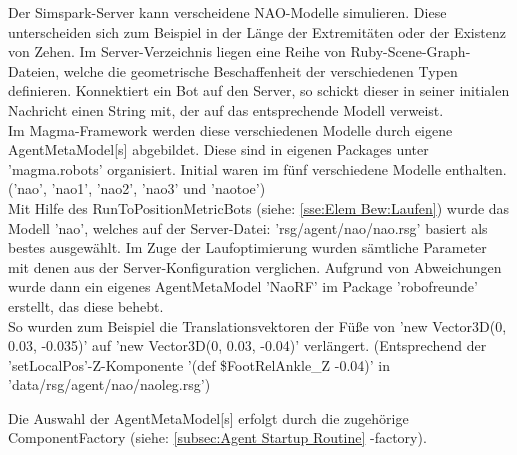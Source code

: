 Der Simspark-Server kann verscheidene NAO-Modelle simulieren. Diese unterscheiden sich zum
Beispiel in der Länge der Extremitäten oder der Existenz von Zehen. Im Server-Verzeichnis
liegen eine Reihe von Ruby-Scene-Graph-Dateien, welche die geometrische Beschaffenheit der
verschiedenen Typen definieren. Konnektiert ein Bot auf den Server, so schickt dieser in seiner initialen Nachricht einen String mit, der auf das entsprechende Modell verweist.\\

Im Magma-Framework werden diese verschiedenen Modelle durch eigene AgentMetaModel[s]
abgebildet. Diese sind in eigenen Packages unter 'magma.robots' organisiert. Initial waren
im fünf verschiedene Modelle enthalten. ('nao', 'nao1', 'nao2', 'nao3' und 'naotoe')\\
Mit Hilfe des RunToPositionMetricBots (siehe: \ref{sse:Elem Bew:Laufen}) wurde das Modell 'nao', welches auf der Server-Datei: 'rsg/agent/nao/nao.rsg' basiert als bestes ausgewählt. Im Zuge der Laufoptimierung wurden sämtliche Parameter mit denen aus der Server-Konfiguration verglichen.
Aufgrund von Abweichungen wurde dann ein eigenes AgentMetaModel 'NaoRF' im Package
'robofreunde' erstellt, das diese behebt.\\
So wurden zum Beispiel die Translationsvektoren der Füße von 'new Vector3D(0, 0.03, -0.035)'
auf 'new Vector3D(0, 0.03, -0.04)' verlängert. (Entsprechend der 'setLocalPos'-Z-Komponente
'(def \$FootRelAnkle\_Z -0.04)' in 'data/rsg/agent/nao/naoleg.rsg')

Die Auswahl der AgentMetaModel[s] erfolgt durch die zugehörige ComponentFactory (siehe: 
\ref{subsec:Agent Startup Routine} -factory). 